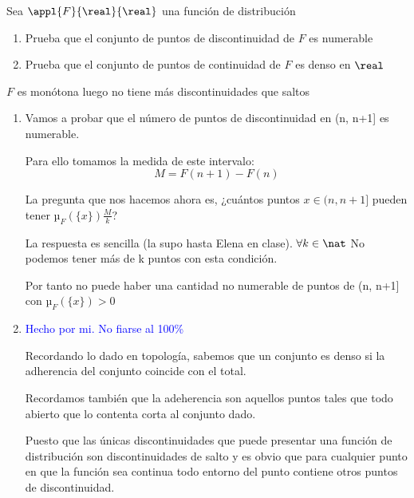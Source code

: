 \begin{problem}
Sea $\appl{F}{\real}{\real}$ una función de distribución
\begin{enumerate}
\item Prueba que el conjunto de puntos de discontinuidad de $F$ es numerable
\item Prueba que el conjunto de puntos de continuidad de $F$ es denso en $\real$
\end{enumerate}
\obs $F$ es monótona luego no tiene más discontinuidades que saltos
\solution

\begin{enumerate}
\item Vamos a probar que el número de puntos de discontinuidad en (n, n+1] es numerable.

Para ello tomamos la medida de este intervalo:
\[M = F(n+1)-F(n)\]

La pregunta que nos hacemos ahora es, ¿cuántos puntos $x \in (n, n+1]$ pueden tener $µ_F(\{x\}) \frac{M}{k}$?

La respuesta es sencilla (la supo hasta Elena en clase). $\forall k \in \nat$ No podemos tener más de k puntos con esta condición.

Por tanto no puede haber una cantidad no numerable de puntos de (n, n+1] con $µ_F(\{x\})>0$



\item \textcolor{blue}{Hecho por mi. No fiarse al 100\%}

Recordando lo dado en topología, sabemos que un conjunto es denso si la adherencia del conjunto coincide con el total.

Recordamos también que la adeherencia son aquellos puntos tales que todo abierto que lo contenta corta al conjunto dado.

Puesto que las únicas discontinuidades que puede presentar una función de distribución son discontinuidades de salto y es obvio que para cualquier punto en que la función sea continua todo entorno del punto contiene otros puntos de discontinuidad.
\end{enumerate}
\end{problem}

